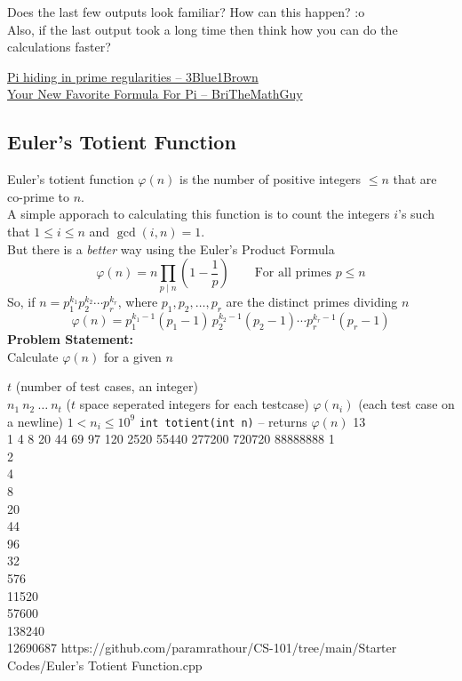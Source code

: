 \begin{noteI}
Does the last few outputs look familiar? How can this happen? :o\\
Also, if the last output took a long time then think how you can do the calculations faster?
\end{noteI}
\begin{funvideo}
\href{https://youtu.be/NaL_Cb42WyY}{Pi hiding in prime regularities -- 3Blue1Brown}\\
\href{https://youtu.be/VftM4LpTrkI}{Your New Favorite Formula For Pi -- BriTheMathGuy}
\end{funvideo}
\subsection{Euler's Totient Function}\label{pp:eulertotient}
Euler's totient function $\varphi(n)$ is the number of positive integers $\leq n$ that are co-prime to $n$.\\
A simple apporach to calculating this function is to count the integers $i$'s such that $1\leq i\leq n$ and $\gcd(i,n) = 1$.\\
But there is a \emph{better} way using the Euler's Product Formula
\begin{equation}
	\varphi (n)=n\prod _{p\mid n}\left(1-{\frac {1}{p}}\right)\qquad\text{For all primes $p\leq n$}
\end{equation}
So, if  ${\displaystyle n=p_{1}^{k_{1}}p_{2}^{k_{2}}\cdots p_{r}^{k_{r}}}$, where ${\displaystyle p_{1},p_{2},\ldots ,p_{r}}$ are the distinct primes dividing $n$
\begin{equation*}
	{\displaystyle \varphi (n)=p_{1}^{k_{1}-1}(p_{1}{-}1)\,p_{2}^{k_{2}-1}(p_{2}{-}1)\cdots p_{r}^{k_{r}-1}(p_{r}{-}1)}
\end{equation*}
\textbf{Problem Statement:}\\
Calculate $\varphi(n)$ for a given $n$

\begin{testcasesFunction}
	{$t$ \hfill(number of test cases, an integer)\\
	$n_1\ n_2\ \ldots\ n_t$ \hfill($t$ space seperated integers for each testcase)}
	{$\varphi(n_i)$ \hfill(each test case on a newline)}
	{$1 < n_i \leq 10^{9}$}
	{\texttt{int totient(int n)} -- returns $\varphi(n)$}
	{13\\1 4 8 20 44 69 97 120 2520 55440 277200 720720 88888888}
	{1\\2\\4\\8\\20\\44\\96\\32\\576\\11520\\57600\\138240\\12690687}
	{https://github.com/paramrathour/CS-101/tree/main/Starter Codes/Euler's Totient Function.cpp}
\end{testcasesFunction}
